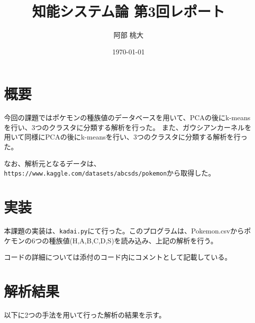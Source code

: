 \documentclass[a4paper,11pt]{jsarticle}
\begin{document}
\title{知能システム論 第3回レポート}
\author{阿部 桃大}
\date{\today}
\maketitle
\section{概要}
今回の課題ではポケモンの種族値のデータベースを用いて、PCAの後にk-meansを行い、3つのクラスタに分類する解析を行った。
また、ガウシアンカーネルを用いて同様にPCAの後にk-meansを行い、3つのクラスタに分類する解析を行った。

なお、解析元となるデータは、\texttt{https://www.kaggle.com/datasets/abcsds/pokemon}から取得した。

\section{実装}
本課題の実装は、\texttt{kadai.py}にて行った。このプログラムは、Pokemon.csvからポケモンの6つの種族値(H,A,B,C,D,S)を読み込み、上記の解析を行う。

コードの詳細については添付のコード内にコメントとして記載している。

\newpage

\section{解析結果}
以下に2つの手法を用いて行った解析の結果を示す。
\end{document}
